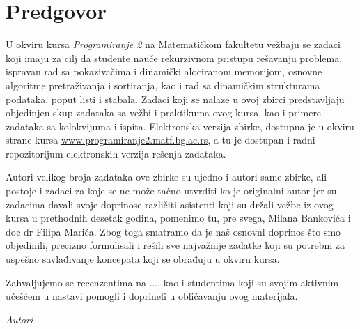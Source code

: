 
\chapter*{Predgovor}

U okviru kursa {\em Programiranje 2} na Matematičkom fakultetu vežbaju se zadaci 
koji imaju za cilj da studente nauče rekurzivnom pristupu rešavanju problema, 
ispravan rad sa pokazivačima i dinamički alociranom memorijom,  osnovne algoritme 
pretraživanja i sortiranja, kao i rad sa dinamičkim strukturama podataka, 
poput listi i stabala. Zadaci koji se nalaze u ovoj zbirci predstavljaju 
objedinjen skup zadataka sa vežbi i praktikuma ovog kursa, kao i primere 
zadataka sa kolokvijuma i ispita. Elektronska verzija zbirke, dostupna je u okviru
strane kursa \url{www.programiranje2.matf.bg.ac.rs}, a tu je dostupan i radni 
repozitorijum elektronskih verzija rešenja zadataka.

Autori velikog broja zadataka ove zbirke su ujedno i autori same zbirke, ali postoje 
i zadaci za koje se ne može tačno utvrditi ko je originalni autor jer su zadacima 
davali svoje doprinose različiti asistenti koji su držali vežbe iz ovog kursa u 
prethodnih desetak godina, pomenimo tu, pre svega, Milana Bankovića i doc dr 
Filipa Marića. Zbog toga smatramo da je naš osnovni doprinos što smo objedinili, 
precizno formulisali i rešili sve najvažnije zadatke koji su potrebni za 
uspešno savlađivanje koncepata koji se obrađuju u okviru kursa. 

Zahvaljujemo se recenzentima na ..., kao i studentima koji su svojim aktivnim 
učešćem u nastavi pomogli i doprineli u obličavanju ovog materijala.  




\bigskip

\begin{flushright}
{\em Autori}
\end{flushright}
